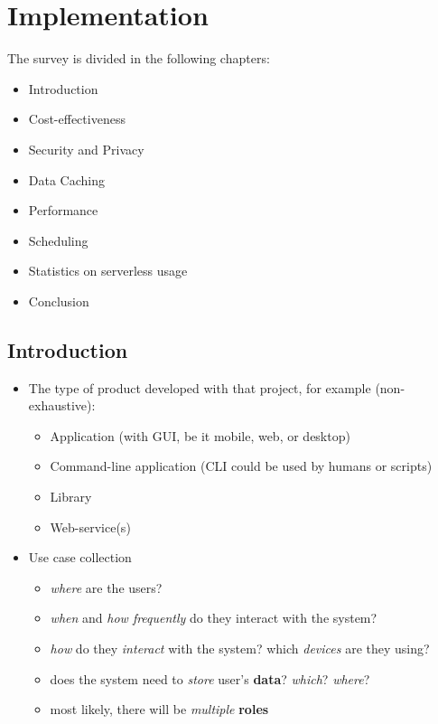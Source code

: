 \documentclass{scrartcl}
\begin{document}
\newpage
\section{Implementation}
The survey is divided in the following chapters:

\begin{itemize}
  \item Introduction
  \item Cost-effectiveness 
  \item Security and Privacy 
  \item Data Caching 
  \item Performance 
  \item Scheduling 
  \item Statistics on serverless usage 
  \item Conclusion
\end{itemize}

\subsection{Introduction}





\begin{itemize}
  \item The type of product developed with that project, for example
  (non-exhaustive):

  \begin{itemize}
    \item Application (with GUI, be it mobile, web, or desktop)
    \item Command-line application (CLI could be used by humans or scripts)
    \item Library
    \item Web-service(s)
  \end{itemize}
  \item Use case collection

  \begin{itemize}
    \item \emph{where} are the users?
    \item \emph{when} and \emph{how frequently} do they interact with the
    system?
    \item \emph{how} do they \emph{interact} with the system? which
    \emph{devices} are they using?
    \item does the system need to \emph{store} user's \textbf{data}?
    \emph{which}? \emph{where}?
    \item most likely, there will be \emph{multiple} \textbf{roles}
  \end{itemize}
\end{itemize}
\end{document}
